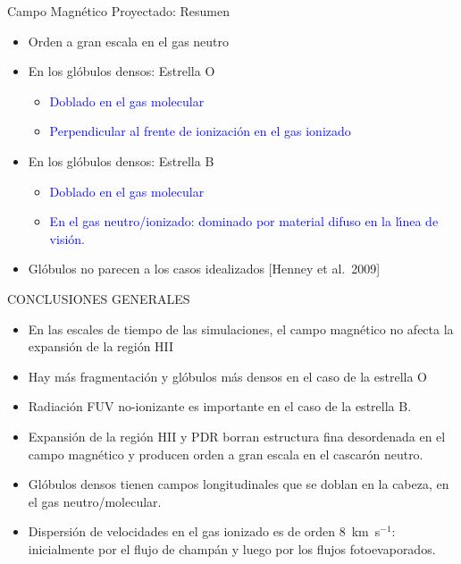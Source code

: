 \documentclass
[
]
{beamer}
\newcommand\blue{\textcolor{blue}}
\begin{document}
{
\begin{frame}[plain]
\centerline{Campo Magn\'etico Proyectado: Resumen}
\vfill
\begin{itemize}
\item<1-> Orden a gran escala en el gas neutro
\vfill
\item<2-> En los gl\'obulos densos: Estrella O
 \begin{itemize}
    \item<2->\blue{Doblado en el gas molecular}
    \item<2-> \blue{Perpendicular al frente de ionizaci\'on en el gas ionizado}
\end{itemize}
\vfill
\item<3-> En los gl\'obulos densos: Estrella B
\begin{itemize}
    \item<3-> \blue{Doblado en el gas molecular}
    \item<3-> \blue{En el gas neutro/ionizado: dominado por material difuso en la
    l\'{\i}nea de visi\'on.}
  \end{itemize}
\vfill
\item<4-> Gl\'obulos no parecen a los casos idealizados [Henney et al.\ 2009]
\end{itemize}
\vfill
\end{frame}
\begin{frame}[plain]
\centerline{CONCLUSIONES GENERALES}
\vfill
\begin{itemize}
\item En las escales de tiempo de las simulaciones, el campo
  magn\'etico no afecta la expansi\'on de la regi\'on HII
\item Hay m\'as fragmentaci\'on y gl\'obulos m\'as densos en el caso
  de la estrella O
\item Radiaci\'on FUV no-ionizante es importante en el caso de la
  estrella B.
\item Expansi\'on de la regi\'on HII y PDR borran estructura fina
  desordenada en el campo magn\'etico y producen orden a gran escala
  en el cascar\'on neutro.
\item Gl\'obulos densos tienen campos longitudinales que se doblan en
  la cabeza, en el gas neutro/molecular.
\item Dispersi\'on de velocidades en el gas ionizado es de orden
  8~km~s$^{-1}$: inicialmente por el flujo de champ\'an y luego por
  los flujos fotoevaporados.
\end{itemize}
\vfill
\end{frame}
}
\end{document}
